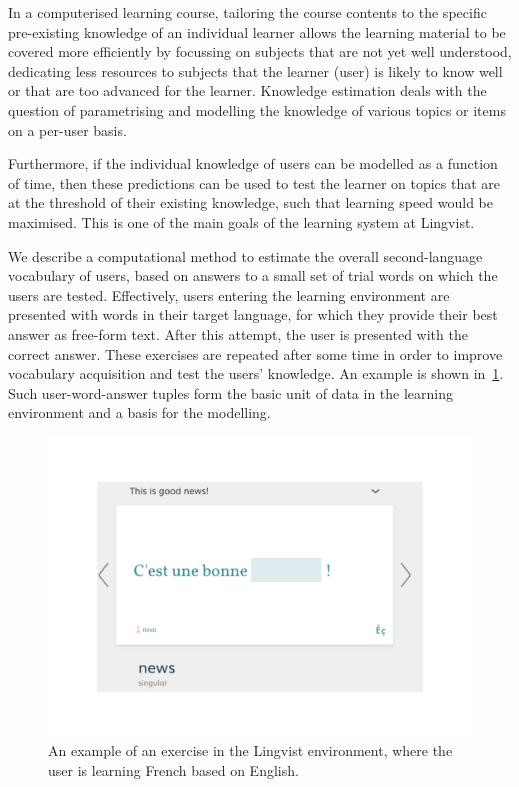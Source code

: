 In a computerised learning course, tailoring the course contents to the specific pre-existing knowledge of an individual learner allows the learning material to be covered more efficiently by focussing on subjects that are not yet well understood, dedicating less resources to subjects that the learner (user) is likely to know well or that are too advanced for the learner. Knowledge estimation deals with the question of parametrising and modelling the knowledge of various topics or items on a per-user basis. 

Furthermore, if the individual knowledge of users can be modelled as a function of time, then these predictions can be used to test the learner on topics that are at the threshold of their existing knowledge, such that learning speed would be maximised. This is one of the main goals of the learning system at Lingvist.

We describe a computational method to estimate the overall second-language vocabulary of users, based on answers to a small set of trial words on which the users are tested. Effectively, users entering the learning environment are presented with words in their target language, for which they provide their best answer as free-form text. After this attempt, the user is presented with the correct answer. These exercises are repeated after some time in order to improve vocabulary acquisition and test the users' knowledge. An example is shown in~\cref{fig:lu_example}. Such user-word-answer tuples form the basic unit of data in the learning environment and a basis for the modelling.

\begin{figure}
\centering
\includegraphics[width=0.6\linewidth]{figures/lingvist/example_lu.pdf}
\caption[An example exercise in the Lingvist environment]{An example of an exercise in the Lingvist environment, where the user is learning French based on English.} 
\label{fig:lu_example} 
\end{figure} 

